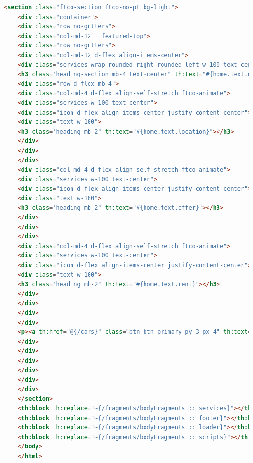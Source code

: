 \documentclass[12pt]{article}
\begin{document}
\begin{lstlisting}[language=HTML, caption={Kod HTML strony głównej}]
	<section class="ftco-section ftco-no-pt bg-light">
	<div class="container">
	<div class="row no-gutters">
	<div class="col-md-12	featured-top">
	<div class="row no-gutters">
	<div class="col-md-12 d-flex align-items-center">
	<div class="services-wrap rounded-right rounded-left w-100 text-center">
	<h3 class="heading-section mb-4 text-center" th:text="#{home.text.main}"></h3>
	<div class="row d-flex mb-4">
	<div class="col-md-4 d-flex align-self-stretch ftco-animate">
	<div class="services w-100 text-center">
	<div class="icon d-flex align-items-center justify-content-center"><span class="flaticon-route"></span></div>
	<div class="text w-100">
	<h3 class="heading mb-2" th:text="#{home.text.location}"></h3>
	</div>
	</div>
	</div>
	<div class="col-md-4 d-flex align-self-stretch ftco-animate">
	<div class="services w-100 text-center">
	<div class="icon d-flex align-items-center justify-content-center"><span class="flaticon-handshake"></span></div>
	<div class="text w-100">
	<h3 class="heading mb-2" th:text="#{home.text.offer}"></h3>
	</div>
	</div>
	</div>
	<div class="col-md-4 d-flex align-self-stretch ftco-animate">
	<div class="services w-100 text-center">
	<div class="icon d-flex align-items-center justify-content-center"><span class="flaticon-rent"></span></div>
	<div class="text w-100">
	<h3 class="heading mb-2" th:text="#{home.text.rent}"></h3>
	</div>
	</div>
	</div>
	</div>
	<p><a th:href="@{/cars}" class="btn btn-primary py-3 px-4" th:text="#{home.submit}"></a></p>
	</div>
	</div>
	</div>
	</div>
	</div>
	</div>
	</section>
	<th:block th:replace="~{/fragments/bodyFragments :: services}"></th:block>
	<th:block th:replace="~{/fragments/bodyFragments :: footer}"></th:block>
	<th:block th:replace="~{/fragments/bodyFragments :: loader}"></th:block>
	<th:block th:replace="~{/fragments/bodyFragments :: scripts}"></th:block>
	</body>
	</html>
	\end{lstlisting}
	
\end{document}
